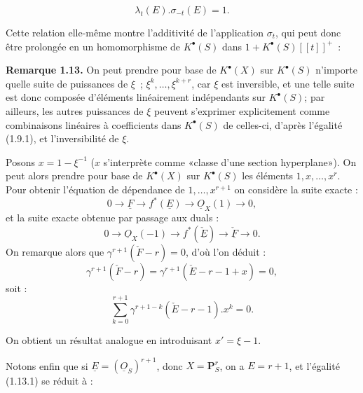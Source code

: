 
\begin{equation}\tag{1.12.1}
  \lambda_t(E).\sigma_{-t}(E)=1.
\end{equation}

Cette relation elle-même montre l'additivité de l'application \(\sigma_t\), qui peut donc être prolongée en un homomorphisme de \(K^{\bullet}(S)\) dans \(1+K^{\bullet}(S)[[t]]^+\)~:

\textbf{Remarque 1.13.} On peut prendre pour base de \(K^{\bullet}(X)\) sur \(K^{\bullet}(S)\) n'importe quelle suite de puissances de \(\xi\)~; \(\xi^k,\ldots,\xi^{k+r}\), car \(\xi\) est inversible, et une telle suite est donc composée d'éléments linéairement indépendants sur \(K^{\bullet}(S)\); par ailleurs, les autres puissances de \(\xi\) peuvent s'exprimer explicitement comme combinaisons linéaires à coefficients dans \(K^{\bullet}(S)\) de celles-ci, d'après l'égalité (1.9.1), et l'inversibilité de \(\xi\).

Posons \(x=1-\xi^{-1}\) (\(x\) s'interprète comme «classe d'une section hyperplane»). On peut alors prendre pour base de \(K^{\bullet}(X)\) sur \(K^{\bullet}(S)\) les éléments \(1,x,\ldots,x^r\). Pour obtenir l'équation de dépendance de \(1,\ldots,x^{r+1}\) on considère la suite exacte :
\[
  0\longrightarrow \underline{F}\longrightarrow f^*(\underline{E})\longrightarrow \underline{O}_X(1)\longrightarrow0,
\]
et la suite exacte obtenue par passage aux duals :
\[
  0\longrightarrow \underline{O}_X(-1)\longrightarrow f^*(\check{\underline{E}})\longrightarrow \check{\underline{F}}\longrightarrow0.
\]
On remarque alors que \(\gamma^{r+1}(\check F-r)=0\), d'où l'on déduit :
\[
  \gamma^{r+1}(\check F-r)=\gamma^{r+1}(\check E-r-1+x)=0,
\]
soit :
\begin{equation}\tag{1.13.1}
  \sum_{k=0}^{r+1}\gamma^{r+1-k}(\check E-r-1).x^k=0.
\end{equation}

On obtient un résultat analogue en introduisant \(x'=\xi-1\).

Notons enfin que si \(\underline{E}=(\underline{O}_S)^{r+1}\), donc \(X=\mathbf P_S^r\), on a \(E=r+1\), et l'égalité (1.13.1) se réduit à :
